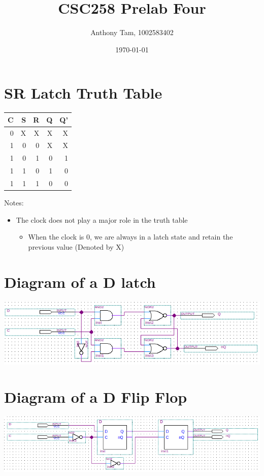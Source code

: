 \documentclass[11pt]{article}
\author{Anthony Tam, 1002583402}
\date{\today}
\title{CSC258 Prelab Four}
\begin{document}
\maketitle


\section{SR Latch Truth Table}
\label{sec-1}

\begin{center}
\begin{tabular}{rrrrr}
C & S & R & Q & Q'\\
\hline
0 & X & X & X & X\\
1 & 0 & 0 & X & X\\
1 & 0 & 1 & 0 & 1\\
1 & 1 & 0 & 1 & 0\\
1 & 1 & 1 & 0 & 0\\
\end{tabular}
\end{center}

Notes:
\begin{itemize}
\item The clock does not play a major role in the truth table
\begin{itemize}
\item When the clock is 0, we are always in a latch state and retain the previous value (Denoted by X)
\end{itemize}
\end{itemize}

\section{Diagram of a D latch}
\label{sec-2}
\includegraphics[width=\textwidth]{dlatch.png}

\section{Diagram of a D Flip Flop}
\label{sec-3}
\includegraphics[width=\textwidth]{dflipflop.png}
\end{document}
